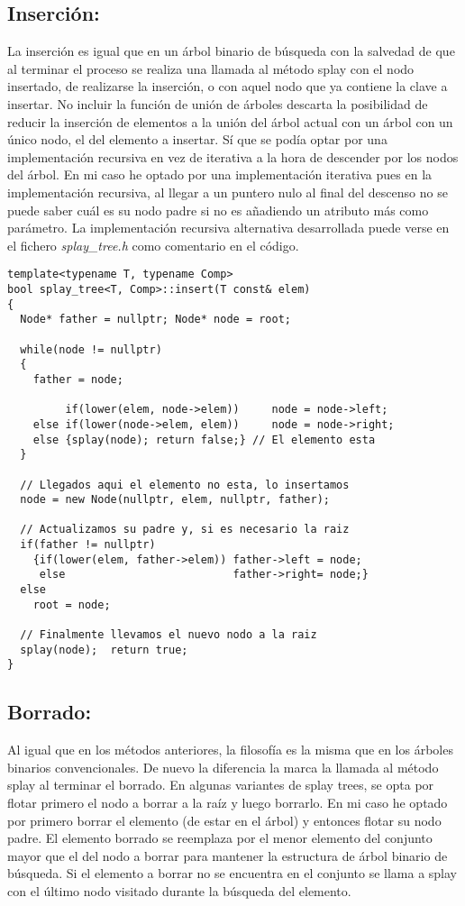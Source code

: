 \documentclass[letterpaper,12pt]{article}
\begin{document}
\subsection{Inserción:}

La inserción es igual que en un árbol binario de búsqueda con la salvedad de 
que al terminar el proceso se realiza una llamada al método splay con el nodo 
insertado, de realizarse la inserción, o con aquel nodo que ya contiene la 
clave a insertar. No incluir la función de unión de árboles descarta la 
posibilidad de reducir la inserción de elementos a la unión del árbol actual
con un árbol con un único nodo, el del elemento a insertar. Sí que se podía
optar por una implementación recursiva en vez de iterativa a la hora de 
descender por los nodos del árbol. En mi caso he optado por una implementación
iterativa pues en la implementación recursiva, al llegar a un puntero nulo al
final del descenso no se puede saber cuál es su nodo padre si no es añadiendo
un atributo más como parámetro. La implementación recursiva alternativa 
desarrollada puede verse en el fichero \textit{splay\_tree.h} como comentario
en el código.

\begin{lstlisting}
template<typename T, typename Comp>
bool splay_tree<T, Comp>::insert(T const& elem)
{
  Node* father = nullptr; Node* node = root;

  while(node != nullptr)
  {
    father = node;

         if(lower(elem, node->elem))     node = node->left;
    else if(lower(node->elem, elem))     node = node->right;
    else {splay(node); return false;} // El elemento esta
  }

  // Llegados aqui el elemento no esta, lo insertamos
  node = new Node(nullptr, elem, nullptr, father);

  // Actualizamos su padre y, si es necesario la raiz
  if(father != nullptr)
    {if(lower(elem, father->elem)) father->left = node;
     else                          father->right= node;}
  else
    root = node;

  // Finalmente llevamos el nuevo nodo a la raiz
  splay(node);  return true;
}
\end{lstlisting}
\subsection{Borrado:}

Al igual que en los métodos anteriores, la filosofía es la misma que en los
árboles binarios convencionales. De nuevo la diferencia la marca la llamada al
método splay al terminar el borrado. En algunas variantes de splay trees, se 
opta por flotar primero el nodo a borrar a la raíz y luego borrarlo. En mi 
caso he optado por primero borrar el elemento (de estar en el árbol) y
entonces flotar su nodo padre. El elemento borrado se reemplaza por el menor 
elemento del conjunto mayor que el del nodo a borrar para mantener la 
estructura de árbol binario de búsqueda. Si el elemento a borrar no se 
encuentra en el conjunto se llama a splay con el último nodo visitado durante
la búsqueda del elemento.
\end{document}
